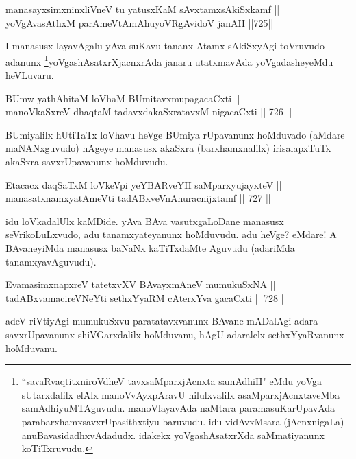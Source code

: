 \begin{shl}
manasayxsimxninxliVneV tu yatusxKaM sAvxtamxsAkiSxkamf || \\
yoVgAvasAthxM parAmeVtAmAhuyoVRgAvidoV janAH \hfill ||725||  
\end{shl}

\begin{artha} 
I manasusx layavAgalu yAva suKavu tananx Atamx sAkiSxyAgi toVruvudo adanunx \footnote{``savaRvaqtitxniroVdheV tavxsaMparxjAcnxta samAdhiH" eMdu yoVga sUtarxdalilx elAlx manoVvAyxpAravU nilulxvalilx asaMparxjAcnxtaveMba samAdhiyuMTAguvudu. manoVlayavAda naMtara paramasuKarUpavAda parabarxhamxsavxrUpasithxtiyu baruvudu. idu vidAvxMsara (jAcnxnigaLa) anuBavasidadhxvAdadudx. idakekx yoVgashAsatxrXda saMmatiyanunx koTiTxruvudu.}yoVgashAsatxrXjacnxrAda janaru utatxmavAda yoVgadasheyeMdu heVLuvaru.
\end{artha}

\begin{shl}
BUmw yathA\s \s hitaM loVhaM BUmitavxmupagacaCxti || \\
manoV\s kaSxreV dhaqtaM tadavxdakaSxratavxM nigacaCxti \hfill || 726 ||  
\end{shl}

\begin{artha} 
BUmiyalilx hUtiTaTx loVhavu heVge BUmiya rUpavanunx hoMduvado (aMdare maNANxguvudo) hAgeye manasusx akaSxra (barxhamxnalilx) irisalapxTuTx akaSxra savxrUpavanunx hoMduvudu.
\end{artha}

\begin{shl}
Etacacx daqSaTxM loVkeV\s pi yeYBARveYH saMparxyujayxteV || \\
manasatxnamxyatAmeVti tadABxveVnAnuracnijxtamf \hfill || 727 ||  
\end{shl}

\begin{artha} 
idu loVkadalUlx kaMDide. yAva BAva vasutxgaLoDane manasusx 
seVrikoLuLxvudo, adu tanamxyateyanunx hoMduvudu. adu heVge? eMdare! A 
BAvaneyiMda manasusx baNaNx kaTiTxdaMte Aguvudu (adariMda 
tanamxyavAguvudu).
\end{artha}

\begin{shl}
EvamasimxnapxreV tatetxvXV BAvayxmAneV mumukuSxNA || \\
tadABxvamacireVNeYti sethxYyaRM cAterxYva gacaCxti \hfill || 728 ||  
\end{shl}

\begin{artha} 
adeV riVtiyAgi mumukuSxvu paratatavxvanunx BAvane mADalAgi adara savxrUpavanunx shiVGarxdalilx hoMduvanu, hAgU adaralelx sethxYyaRvanunx hoMduvanu.
\end{artha}

